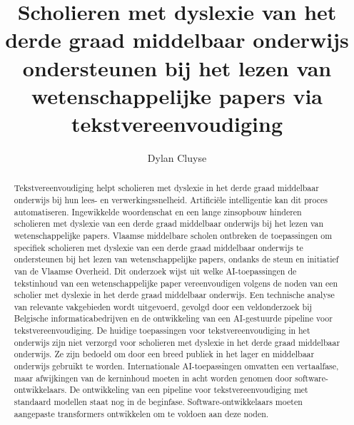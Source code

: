\documentclass{hogent-article}
\title{Scholieren met dyslexie van het derde graad middelbaar onderwijs ondersteunen bij het lezen van wetenschappelijke papers via tekstvereenvoudiging}
\author{Dylan Cluyse}
\begin{document}
\begin{abstract}
Tekstvereenvoudiging helpt scholieren met dyslexie in het derde graad middelbaar onderwijs bij hun lees- en verwerkingssnelheid. Artificiële intelligentie kan dit proces automatiseren. Ingewikkelde woordenschat en een lange zinsopbouw hinderen scholieren met dyslexie van een derde graad middelbaar onderwijs bij het lezen van wetenschappelijke papers. Vlaamse middelbare scholen ontbreken de toepassingen om specifiek scholieren met dyslexie van een derde graad middelbaar onderwijs te ondersteunen bij het lezen van wetenschappelijke papers, ondanks de steun en initiatief van de Vlaamse Overheid. Dit onderzoek wijst uit welke AI-toepassingen de tekstinhoud van een wetenschappelijke paper vereenvoudigen volgens de noden van een scholier met dyslexie in het derde graad middelbaar onderwijs. Een technische analyse van relevante vakgebieden wordt uitgevoerd, gevolgd door een veldonderzoek bij Belgische informaticabedrijven en de ontwikkeling van een AI-gestuurde pipeline voor tekstvereenvoudiging. De huidige toepassingen voor tekstvereenvoudiging in het onderwijs zijn niet verzorgd voor scholieren met dyslexie in het derde graad middelbaar onderwijs. Ze zijn bedoeld om door een breed publiek in het lager en middelbaar onderwijs gebruikt te worden. Internationale AI-toepassingen omvatten een vertaalfase, maar afwijkingen van de kerninhoud moeten in acht worden genomen door software-ontwikkelaars. De ontwikkeling van een pipeline voor tekstvereenvoudiging met standaard modellen staat nog in de beginfase. Software-ontwikkelaars moeten aangepaste transformers ontwikkelen om te voldoen aan deze noden.
\end{abstract}

\tableofcontents



\printbibliography[heading=bibintoc]
\end{document}
